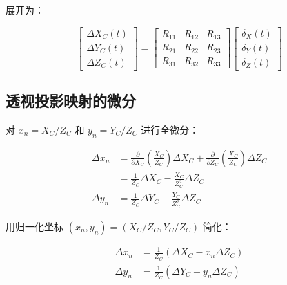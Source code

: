 \documentclass[12pt,a4paper]{article}
\begin{document}
展开为：

\begin{equation}
\begin{bmatrix}
\Delta X_C(t) \\ \Delta Y_C(t) \\ \Delta Z_C(t)
\end{bmatrix}
=
\begin{bmatrix}
R_{11} & R_{12} & R_{13} \\
R_{21} & R_{22} & R_{23} \\
R_{31} & R_{32} & R_{33}
\end{bmatrix}
\begin{bmatrix}
\delta_X(t) \\ \delta_Y(t) \\ \delta_Z(t)
\end{bmatrix}
\label{eq:vibration_camera_expanded}
\end{equation}

\subsection{透视投影映射的微分}

对 $x_n = X_C/Z_C$ 和 $y_n = Y_C/Z_C$ 进行全微分：

\begin{equation}
\begin{aligned}
\Delta x_n &= \frac{\partial}{\partial X_C}\!\left(\frac{X_C}{Z_C}\right) \Delta X_C
           + \frac{\partial}{\partial Z_C}\!\left(\frac{X_C}{Z_C}\right) \Delta Z_C \\
           &= \frac{1}{Z_C} \Delta X_C - \frac{X_C}{Z_C^2} \Delta Z_C \\[8pt]
\Delta y_n &= \frac{1}{Z_C} \Delta Y_C - \frac{Y_C}{Z_C^2} \Delta Z_C
\end{aligned}
\label{eq:projection_differential}
\end{equation}

用归一化坐标 $(x_n, y_n) = (X_C/Z_C, Y_C/Z_C)$ 简化：

\begin{equation}
\begin{aligned}
\Delta x_n &= \frac{1}{Z_C} \left( \Delta X_C - x_n \Delta Z_C \right) \\[6pt]
\Delta y_n &= \frac{1}{Z_C} \left( \Delta Y_C - y_n \Delta Z_C \right)
\end{aligned}
\label{eq:projection_differential_simplified}
\end{equation}
\end{document}
